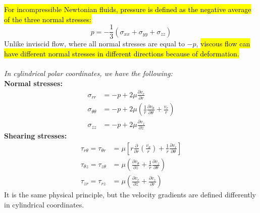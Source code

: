 ﻿\documentclass[12pt]{article}
\begin{document}
\hl{For incompressible Newtonian fluids, pressure is defined as the negative average of the three normal stresses:}
\[
\boxed{p=-\frac13(\sigma_{xx}+\sigma_{yy}+\sigma_{zz})}
\]
Unlike inviscid flow, where all normal stresses are equal to \(-p\), \hl{viscous flow can have different normal stresses in different directions because of deformation.}\\\\
\textit{In cylindrical polar coordinates, we have the following:}\\
\textbf{Normal stresses:}
\[
\begin{aligned}
\sigma_{rr} &= -p + 2\mu\frac{\partial v_r}{\partial r}\\
\sigma_{\theta\theta} &= -p + 2\mu\left(\frac{1}{r}\frac{\partial v_\theta}{\partial\theta}+\frac{v_r}{r}\right)\\
\sigma_{zz} &= -p + 2\mu\frac{\partial v_z}{\partial z}
\end{aligned}
\]
\textbf{Shearing stresses:}
\[
\begin{aligned}
\tau_{r\theta}=\tau_{\theta r} &= \mu\left[r\frac{\partial}{\partial r}\left(\frac{v_\theta}{r}\right)+\frac{1}{r}\frac{\partial v_r}{\partial\theta}\right]\\
\tau_{\theta z}=\tau_{z\theta} &= \mu\left(\frac{\partial v_\theta}{\partial z}+\frac{1}{r}\frac{\partial v_z}{\partial\theta}\right)\\
\tau_{zr}=\tau_{rz} &= \mu\left(\frac{\partial v_r}{\partial z}+\frac{\partial v_z}{\partial r}\right)
\end{aligned}
\]
It is the same physical principle, but the velocity gradients are defined differently in cylindrical coordinates.
\end{document}
